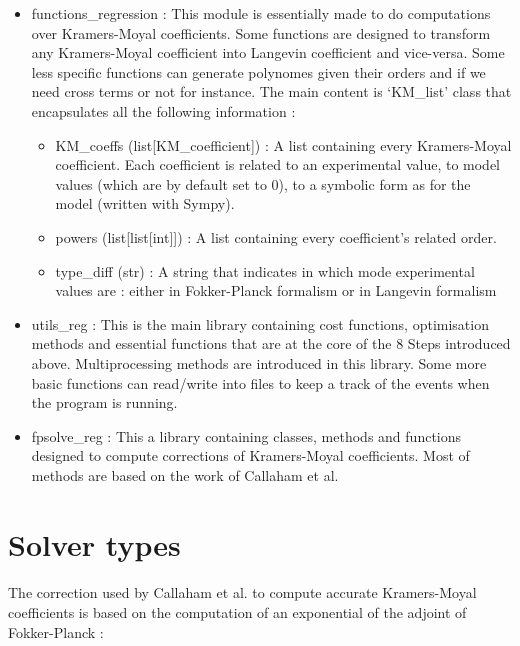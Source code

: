\documentclass[A4paper]{article}
\begin{document}
\begin{itemize}
\item functions\_regression : This module is essentially made to do computations over Kramers-Moyal coefficients. Some functions are designed to transform any Kramers-Moyal coefficient into Langevin coefficient and vice-versa. Some less specific functions can generate polynomes given their orders and if we need cross terms or not for instance. The main content is `KM\_list' class that encapsulates all the following information :
\begin{itemize}
\item KM\_coeffs (list[KM\_coefficient]) : A list containing every Kramers-Moyal coefficient. Each coefficient is related to an experimental value, to model values (which are by default set to 0), to a symbolic form as for the model (written with Sympy).

\item powers (list[list[int]]) : A list containing every coefficient's related order.

\item type\_diff (str) : A string that indicates in which mode experimental values are : either in Fokker-Planck formalism or in Langevin formalism
\end{itemize}

\item utils\_reg : This is the main library containing cost functions, optimisation methods and essential functions that are at the core of the 8 Steps introduced above. Multiprocessing methods are introduced in this library. Some more basic functions can read/write into files to keep a track of the events when the program is running.

\item fpsolve\_reg : This a library containing classes, methods and functions designed to compute corrections of Kramers-Moyal coefficients. Most of methods are based on the work of Callaham et al.

\end{itemize}

\section{Solver types}
\paragraph{}
The correction used by Callaham et al. to compute accurate Kramers-Moyal coefficients is based on the computation of an exponential of the adjoint of Fokker-Planck :
\end{document}
